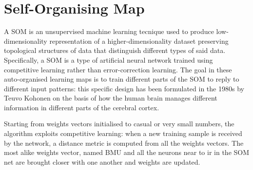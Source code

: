 \section{Self-Organising Map}
\label{sec:SOM}
A \ac{SOM} is an unsupervised machine learning tecnique used to produce low-dimensionality representation of a higher-dimensionality dataset preserving topological structures of data that distinguish different types of said data. Specifically, a \ac{SOM} is a type of artificial neural network trained using competitive learning rather than error-correction learning. The goal in these auto-organised learning maps is to train different parts of the \ac{SOM} to reply to different input patterns: this specific design has been formulated in the 1980s by Teuvo Kohonen on the basis of how the human brain manages different information in different parts of the cerebral cortex.

Starting from weights vectors initialised to casual or very small numbers, the algorithm exploits competitive learning: when a new training sample is received by the network, a distance metric is computed from all the weights vectors. The most alike weights vector, named \ac{BMU} and all the neurons near to ir in the \ac{SOM} net are brought closer with one another and weights are updated.